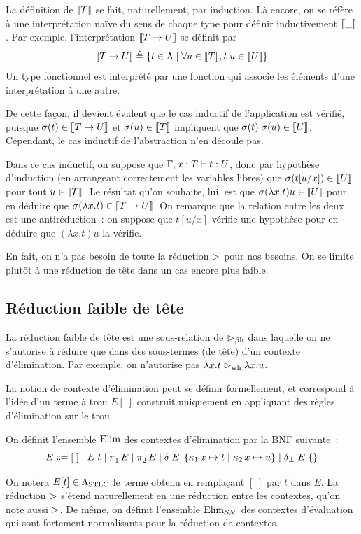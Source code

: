 La définition de $\llbracket T\rrbracket$ se fait, naturellement, par induction.
Là encore, on se réfère à une interprétation naïve du sens de chaque type pour
définir inductivement $\llbracket\mathord{\_}\rrbracket$. Par exemple, l'interprétation
$\llbracket T \to U\rrbracket$ se définit par
\[\llbracket T\to U\rrbracket\triangleq
\left\{ t \in \Lambda \;\middle\vert\; \forall u \in \llbracket T\rrbracket,t\;u\in\llbracket U\rrbracket \right\}\]
Un type fonctionnel est interprété par une fonction qui associe les éléments
d'une interprétation à une autre.

De cette façon, il devient évident que le cas inductif de l'application est
vérifié, puisque $\sigma(t)\in\llbracket T\to U\rrbracket$ et
$\sigma(u)\in\llbracket T\rrbracket$ impliquent que
$\sigma(t)\;\sigma(u)\in\llbracket U\rrbracket$.
Cependant, le cas inductif de l'abstraction n'en découle pas.

Dans ce cas inductif, on suppose que $\Gamma, x : T\mathrel{\vdash} t : U$,
donc par hypothèse d'induction (en arrangeant correctement les variables
libres) que $\sigma(t[u/x]) \in \llbracket U\rrbracket$ pour tout
$u\in\llbracket T\rrbracket$. Le résultat qu'on souhaite, lui, est que
$\sigma(\lambda x.t)u \in \llbracket U\rrbracket$ pour en déduire que
$\sigma(\lambda x.t)\in\llbracket T\to U\rrbracket$. On remarque que la
relation entre les deux est une antiréduction~: on suppose que $t[u/x]$ vérifie
une hypothèse pour en déduire que $(\lambda x.t)u$ la vérifie.

En fait, on n'a pas besoin de toute la réduction $\rhd$ pour nos besoins.
On se limite plutôt à une réduction de tête dans un cas encore plus faible.

\subsection{Réduction faible de tête}

La réduction faible de tête est une sous-relation de $\mathrel{\rhd_{\beta\mathrm{h}}}$ dans laquelle
on ne s'autorise à réduire que dans des sous-termes (de tête) d'un contexte
d'élimination. Par exemple, on n'autorise pas $\lambda x.t\mathrel{\rhd_{\mathrm{wh}}} \lambda x.u$.

La notion de contexte d'élimination peut se définir formellement, et correspond
à l'idée d'un terme à trou $E[\;]$ construit uniquement en appliquant des
règles d'élimination sur le trou.

\begin{definition}
  On définit l'ensemble $\Elim$ des contextes d'élimination par la BNF
  suivante~:
  \[E \inddefeq [\;]\mid E\;t\mid \projP{1}{}E\mid\projP{2}{}E\mid
  \deltaSTLC E x t x u \mid \dBSTLC{E}\]

  On notera $E[t] \in \Lambda_{\mathrm{STLC}}$ le terme obtenu en remplaçant $[\;]$ par
  $t$ dans $E$. La réduction $\rhd$ s'étend naturellement en une réduction
  entre les contextes, qu'on note aussi $\rhd$. De même, on définit
  l'ensemble $\ElimSN$ des contextes d'évaluation qui sont fortement
  normalisants pour la réduction de contextes.
  \index[notation]{$\Elim$}
  \index[notation]{$\ElimSN$}
\end{definition}

